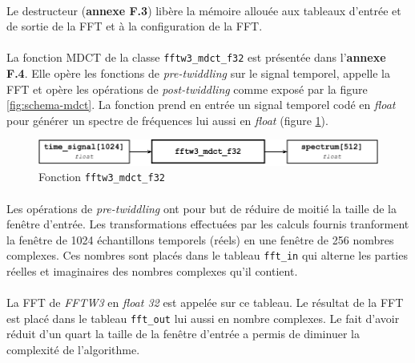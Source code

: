 \documentclass{article}
\begin{document}
    \paragraph{}
    Le destructeur (\textbf{annexe F.3}) libère la mémoire allouée aux tableaux d'entrée et de sortie de la FFT et à la configuration de la FFT.

    \paragraph{}
    La fonction MDCT de la classe \texttt{fftw3\_mdct\_f32} est présentée dans l'\textbf{annexe F.4}. Elle opère les fonctions de \emph{pre-twiddling} sur le signal temporel, appelle la FFT et opère les opérations de \emph{post-twiddling} comme exposé par la figure \ref{fig:schema-mdct}. La fonction prend en entrée un signal temporel codé en \emph{float} pour générer un spectre de fréquences lui aussi en \emph{float} (figure \ref{fig:func_fftw3_mdct_f32}).
    \begin{figure}[H]
        \centering
        \includegraphics[width=.8\linewidth]{./images/func_fftw3_mdct_f32.pdf}
        \caption{Fonction \texttt{fftw3\_mdct\_f32}}
        \label{fig:func_fftw3_mdct_f32}
    \end{figure}


    \paragraph{}
    Les opérations de \emph{pre-twiddling} ont pour but de réduire de moitié la taille de la fenêtre d'entrée. Les transformations effectuées par les calculs fournis tranforment la fenêtre de 1024 échantillons temporels (réels) en une fenêtre de 256 nombres complexes. Ces nombres sont placés dans le tableau \texttt{fft\_in} qui alterne les parties réelles et imaginaires des nombres complexes qu'il contient.

    \paragraph{}
    La FFT de \emph{FFTW3} en \emph{float 32} est appelée sur ce tableau. Le résultat de la FFT est placé dans le tableau \texttt{fft\_out} lui aussi en nombre complexes. Le fait d'avoir réduit d'un quart la taille de la fenêtre d'entrée a permis de diminuer la complexité de l'algorithme.
\end{document}
